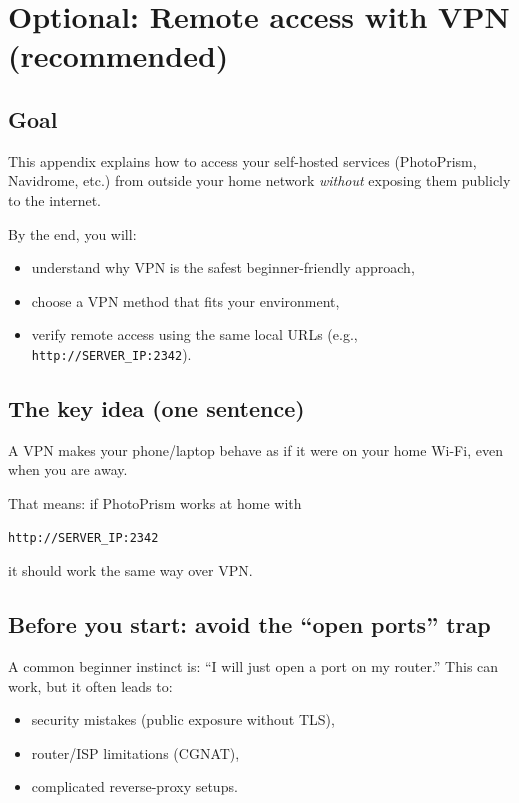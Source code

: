 \chapter{Optional: Remote access with VPN (recommended)}
\label{app:vpn}

\section{Goal}
This appendix explains how to access your self-hosted services (PhotoPrism, Navidrome, etc.)
from outside your home network \emph{without} exposing them publicly to the internet.

By the end, you will:
\begin{itemize}[leftmargin=*]
  \item understand why VPN is the safest beginner-friendly approach,
  \item choose a VPN method that fits your environment,
  \item verify remote access using the same local URLs (e.g., \texttt{http://SERVER\_IP:2342}).
\end{itemize}


\section{The key idea (one sentence)}
A VPN makes your phone/laptop behave as if it were on your home Wi-Fi, even when you are away.

That means: if PhotoPrism works at home with
\begin{lstlisting}
http://SERVER_IP:2342
\end{lstlisting}
it should work the same way over VPN.

\section{Before you start: avoid the ``open ports'' trap}
A common beginner instinct is: ``I will just open a port on my router.''
This can work, but it often leads to:
\begin{itemize}[leftmargin=*]
  \item security mistakes (public exposure without TLS),
  \item router/ISP limitations (CGNAT),
  \item complicated reverse-proxy setups.
\end{itemize}

